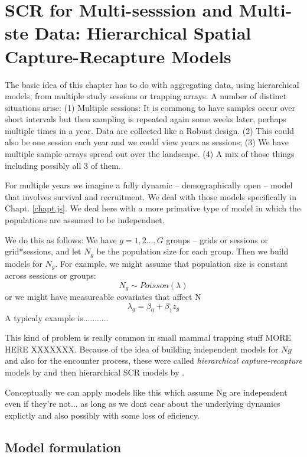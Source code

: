 \chapter{SCR for Multi-sesssion and Multi-ste Data: 
Hierarchical Spatial Capture-Recapture Models}
\label{chapt.hscr}

\vspace{0.3cm}

The basic idea of this chapter has to do with aggregating data, using
hierarchical models, from multiple study sessions or trapping arrays.
A number of distinct situations arise:
(1) Multiple sessions:
It is commong to have samples occur over short intervals but then
sampling is repeated again some weeks later, perhaps multiple times in
a year.  Data are collected like a Robust design.
(2) This could also be one session each year and we could view years
as sessions;
(3) We have multiple sample arrays spread out over the landscape.
(4) A mix of those things including possibly all 3 of them.

For multiple years we imagine a fully dynamic -- demographically open
-- model that involves survival and recruitment. We deal with those
models specifically in Chapt. \ref{chapt.js}.
We deal here with a more primative type of model in which the
populations are assumed to be independnet. 

We do this as follows: We have $g=1,2\ldots, G$ groups -- grids or
sessions or grid*sessions, and let $N_{g}$ be the population size for
each group. Then we build models for $N_{g}$. For example, we might
assume that population size is constant across sessions or groups:
\[
 N_{g} \sim Poisson(\lambda)
\]
or we might have measureable covariates that affect N
\[
 \lambda_{g} = \beta_{0} + \beta_{1} z_{g}
\]
A typicaly example is...........

This kind of problem is really common in small mammal trapping stuff
\citep{converse_royle:xxxx} MORE HERE XXXXXXX.
Because of the idea of building independent models for $Ng$ and also
for the encounter process, these were called 
{\it hierarchical capture-recapture} models by \citep{royle_etal:2013}
and then hierarchical SCR models by \citep{converse_royle:2013}. 

Conceptually we can apply models like this which assume Ng are
independent even if they're not... as long as we dont cear about the
underlying dynamics explictly and also possibly with some loss of
eficiency. 

\section{Model formulation}

